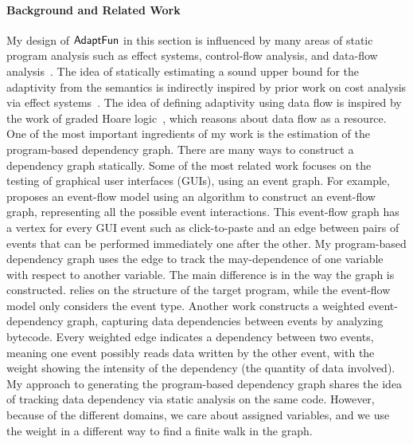%
\paragraph*{Background and Related Work} 
My design of $\textsf{AdaptFun}$ in this section is influenced by many areas of static program analysis such as 
effect systems, control-flow analysis, and data-flow analysis~\cite{ryder1988incremental}. 
The idea of statically estimating a sound upper bound for the adaptivity from the semantics is indirectly inspired by prior work on cost analysis via effect systems~\cite{cciccek2017relational,radivcek2017monadic,qu2019relational}. The idea of defining adaptivity using data flow is inspired by the work of graded 
Hoare logic~\cite{gaboardi2021graded}, which reasons about data flow as a resource. 
%
One of the most important ingredients of my work is the estimation of the program-based dependency graph. 
There are many ways to construct a dependency graph statically.
Some of the most related work focuses on the testing of graphical user interfaces (GUIs), using an event graph. For example, \cite{memon2007event} proposes an event-flow model using an algorithm to construct an event-flow graph, representing all the possible event interactions. 
This event-flow graph has a vertex for every GUI event such as click-to-paste and an edge between pairs of events that can be performed immediately one after the other. My program-based dependency graph uses the edge to track the may-dependence of one variable with respect to another variable. 
The main difference is in the way the graph is constructed. {\THESYSTEM} relies on the structure of the target program, while the event-flow model only considers the event type. 
Another work \cite{arlt2012lightweight} constructs a weighted event-dependency graph, capturing data dependencies between events by analyzing bytecode. 
Every weighted edge indicates a dependency between two events, meaning one event possibly reads data written by the other event, with the weight showing the intensity of the dependency (the quantity of data involved). 
My approach to generating the program-based dependency graph shares the idea of tracking data dependency via static analysis on the same code. 
However, because of the different domains, we care about assigned variables, and we use the weight in a different way to find a finite walk in the graph.

